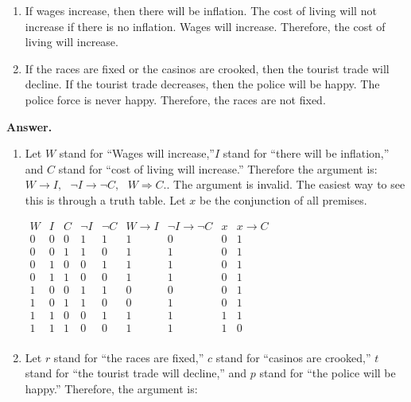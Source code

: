 \documentclass[10pt,]{book}
\theoremstyle{plain}
\theoremstyle{definition}
\theoremstyle{definition}
\theoremstyle{definition}
\theoremstyle{definition}
\begin{document}
\begin{exercisegroup}
\begin{enumerate}[label=\alph*]
\item\hypertarget{li-221}{}If wages increase, then there will be inflation. The cost of living will not increase if there is no inflation. Wages will increase. Therefore, the cost of living will increase.%
\item\hypertarget{li-222}{}If the races are fixed or the casinos are crooked, then the tourist trade will decline. If the tourist trade decreases, then the police will be happy. The police force is never happy. Therefore, the races are not fixed.%
\end{enumerate}
%
\par\smallskip
\par\smallskip
\noindent\textbf{Answer.}\hypertarget{answer-13}{}\quad
\leavevmode%
\begin{enumerate}[label=\alph*]
\item\hypertarget{li-223}{} Let \(W\) stand for ``Wages will increase,''\(I\)
 stand for ``there will be inflation,'' and \(C\) stand for ``cost of living will increase.'' Therefore the argument is: \(W\to I,\text{   }\neg I\to \neg C,\text{   }W\Rightarrow C.\). The argument is invalid. The easiest way to see this is through a truth table. Let \(x\) be the conjunction of all premises.

 \(\begin{array}{ccccccccc}
 W  & I  & C  & \neg I  & \neg C  & W\to I  & \neg I\to \neg C  & x  & x\to C \\
\hline
 0  & 0  & 0  & 1  & 1 & 1  & 0  & 0  & 1 \\
 0  & 0  & 1  & 1  & 0 & 1  & 1  & 0  & 1 \\
 0  & 1  & 0  & 0  & 1 & 1  & 1  & 0  & 1 \\
 0  & 1  & 1  & 0  & 0 & 1  & 1  & 0  & 1 \\
 1  & 0  & 0  & 1  & 1 & 0  & 0  & 0  & 1 \\
 1  & 0  & 1  & 1  & 0 & 0  & 1  & 0  & 1 \\
 1  & 1  & 0  & 0  & 1 & 1  & 1  & 1  & 1 \\
 1  & 1  & 1  & 0  & 0 & 1  & 1  & 1  & 0 \\
\end{array}\)%
\item\hypertarget{li-224}{}Let \(r\) stand for ``the races are fixed,'' \(c\) stand for ``casinos are crooked,'' \(t\) stand for ``the tourist trade will decline,'' and \(p\) stand for ``the police will be happy.'' Therefore, the argument is:


\end{enumerate}
\end{exercisegroup}
\end{document}
